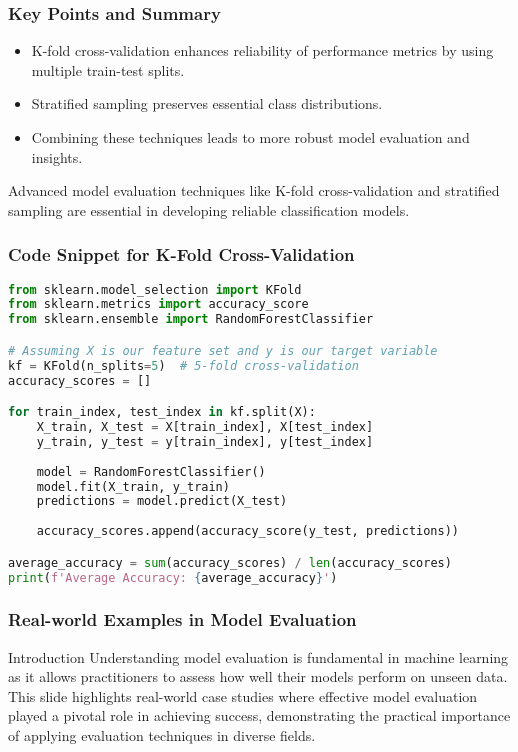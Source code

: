 \documentclass[aspectratio=169]{beamer}
\begin{document}
\begin{frame}[fragile]
    \frametitle{Key Points and Summary}
    \begin{itemize}
        \item K-fold cross-validation enhances reliability of performance metrics by using multiple train-test splits.
        \item Stratified sampling preserves essential class distributions.
        \item Combining these techniques leads to more robust model evaluation and insights.
    \end{itemize}
    
    Advanced model evaluation techniques like K-fold cross-validation and stratified sampling are essential in developing reliable classification models.
\end{frame}

\begin{frame}[fragile]
    \frametitle{Code Snippet for K-Fold Cross-Validation}
    \begin{lstlisting}[language=Python]
from sklearn.model_selection import KFold
from sklearn.metrics import accuracy_score
from sklearn.ensemble import RandomForestClassifier

# Assuming X is our feature set and y is our target variable
kf = KFold(n_splits=5)  # 5-fold cross-validation
accuracy_scores = []

for train_index, test_index in kf.split(X):
    X_train, X_test = X[train_index], X[test_index]
    y_train, y_test = y[train_index], y[test_index]
    
    model = RandomForestClassifier()
    model.fit(X_train, y_train)
    predictions = model.predict(X_test)
    
    accuracy_scores.append(accuracy_score(y_test, predictions))

average_accuracy = sum(accuracy_scores) / len(accuracy_scores)
print(f'Average Accuracy: {average_accuracy}')
    \end{lstlisting}
\end{frame}

\begin{frame}[fragile]
    \frametitle{Real-world Examples in Model Evaluation}
    \begin{block}{Introduction}
        Understanding model evaluation is fundamental in machine learning as it allows practitioners to assess how well their models perform on unseen data. This slide highlights real-world case studies where effective model evaluation played a pivotal role in achieving success, demonstrating the practical importance of applying evaluation techniques in diverse fields.
    \end{block}
\end{frame}
\end{document}
